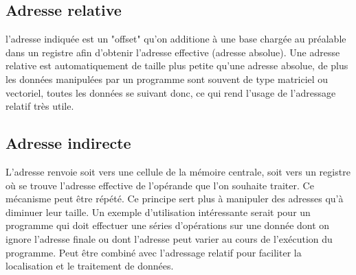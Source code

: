 \documentclass{report}
\begin{document}
\subsection{Adresse relative}
l'adresse indiquée est un "offset" qu'on additione à une base chargée au préalable dans un registre afin d'obtenir l'adresse effective (adresse absolue). Une adresse relative est automatiquement de taille plus petite qu'une adresse absolue, de plus les données manipulées par un programme sont souvent de type matriciel ou vectoriel, toutes les données se suivant donc, ce qui rend l'usage de l'adressage relatif très utile.\\
\subsection{Adresse indirecte}
L'adresse renvoie soit vers une cellule de la mémoire centrale, soit vers un registre où se trouve l'adresse effective de l'opérande que l'on souhaite traiter. Ce mécanisme peut être répété. Ce principe sert plus à manipuler des adresses qu'à diminuer leur taille. Un exemple d'utilisation intéressante serait pour un programme qui doit effectuer une séries d'opérations sur une donnée dont on ignore l'adresse finale ou dont l'adresse peut varier au cours de l'exécution du programme. Peut être combiné avec l'adressage relatif pour faciliter la localisation et le traitement de données.\\ 
\end{document}
